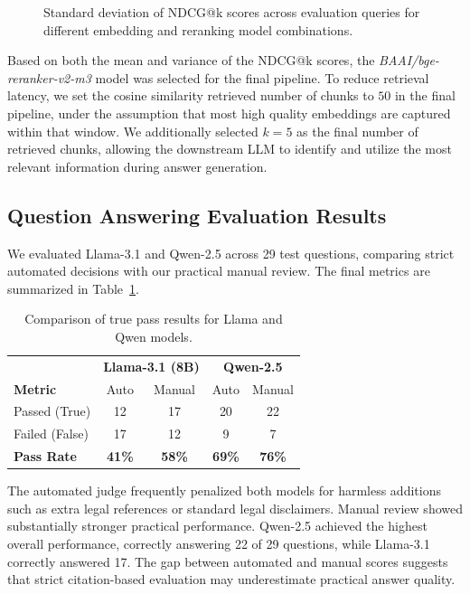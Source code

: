 \documentclass[fleqn,moreauthors,10pt]{ds_report}
\begin{document}
\begin{figure}[H]
  \centering
  
  \caption{
    Standard deviation of NDCG@k scores across evaluation queries for different embedding and reranking model combinations.
  }
  \label{fig:reranking_variance}
\end{figure}

Based on both the mean and variance of the NDCG@k scores, the \textit{BAAI/bge-reranker-v2-m3} model was selected for the final pipeline. To reduce retrieval latency, we set the cosine similarity retrieved number of chunks to $50$ in the final pipeline, under the assumption that most high quality embeddings are captured within that window. We additionally selected $k=5$ as the final number of retrieved chunks, allowing the downstream LLM to identify and utilize the most relevant information during answer generation. 




\subsection*{Question Answering Evaluation Results}

We evaluated Llama-3.1 and Qwen-2.5 across 29 test questions, comparing strict automated decisions with our practical manual review. The final metrics are summarized in Table~\ref{tab:qa_comparison}.

\begin{table}[h]
\centering
\small
\setlength{\tabcolsep}{6pt}
\renewcommand{\arraystretch}{1.1}
\begin{tabular}{lcccc}
\hline
 & \multicolumn{2}{c}{\textbf{Llama-3.1 (8B)}} & \multicolumn{2}{c}{\textbf{Qwen-2.5}} \\
\textbf{Metric} & Auto & Manual & Auto & Manual \\
\hline
Passed (True)   & 12    & 17    & 20   & 22     \\
Failed (False)  & 17   & 12      & 9   & 7      \\
\textbf{Pass Rate} & \textbf{41\%} & \textbf{58\%} & \textbf{69\%} & \textbf{76\%} \\
\hline
\end{tabular}
\caption{Comparison of true pass results for Llama and Qwen models.}
\label{tab:qa_comparison}
\end{table}

The automated judge frequently penalized both models for harmless additions such as extra legal references or standard legal disclaimers. Manual review showed substantially stronger practical performance. Qwen-2.5 achieved the highest overall performance, correctly answering 22 of 29 questions, while Llama-3.1 correctly answered 17. The gap between automated and manual scores suggests that strict citation-based evaluation may underestimate practical answer quality.
\end{document}
